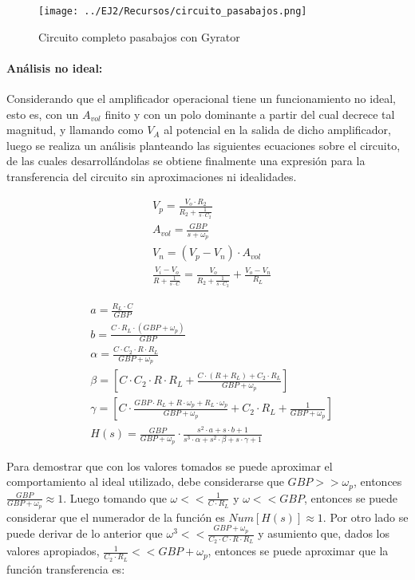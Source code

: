 \begin{figure}[H]
    \centering
    \texttt{[image: ../EJ2/Recursos/circuito\_pasabajos.png]}
    \caption{Circuito completo pasabajos con Gyrator}
    \label{fig:circuito_pasabajos}
\end{figure}

\paragraph*{An\'alisis no ideal:} Considerando que el amplificador operacional tiene un funcionamiento no ideal, esto es, con un $A_{vol}$ finito y con un polo dominante
a partir del cual decrece tal magnitud, y llamando como $V_A$ al potencial en la salida de dicho amplificador, luego se realiza un an\'alisis planteando las siguientes ecuaciones
sobre el circuito, de las cuales desarroll\'andolas se obtiene finalmente una expresi\'on para la transferencia del circuito sin aproximaciones ni idealidades.

\begin{align}
    & V_p = \frac{V_o \cdot R_2}{R_2 + \frac{1}{s \cdot C_2}} \\
    & A_{vol} = \frac{GBP}{s + \omega_p} \\
    & V_n = (V_p - V_n) \cdot A_{vol} \\
    & \frac{V_i - V_o}{R + \frac{1}{s \cdot C}} = \frac{V_o}{R_2 + \frac{1}{s \cdot C_2}} + \frac{V_o - V_n}{R_L}
\end{align}

\begin{align*}
    & a = \frac{R_L \cdot C}{GBP} \\
    & b = \frac{C \cdot R_L \cdot (GBP + \omega_p)}{GBP} \\
    & \alpha = \frac{C \cdot C_2 \cdot R \cdot R_L}{GBP + \omega_p} \\
    & \beta = \left[ C \cdot C_2 \cdot R \cdot R_L + \frac{C \cdot (R + R_L) + C_2 \cdot R_L}{GBP + \omega_p} \right] \\
    & \gamma = \left[C \cdot \frac{GBP \cdot R_L + R \cdot \omega_p + R_L \cdot \omega_p}{GBP + \omega_p} + C_2 \cdot R_L + \frac{1}{GBP + \omega_p} \right] \\
    & H(s) = \frac{GBP}{GBP + \omega_p} \cdot
    \frac{s^{2} \cdot a + s \cdot b + 1}
    {s^{3} \cdot \alpha + s^{2} \cdot \beta + s \cdot \gamma + 1} 
\end{align*}

Para demostrar que con los valores tomados se puede aproximar el comportamiento al ideal utilizado, debe considerarse que $GBP >> \omega_p$, entonces $\frac{GBP}{GBP + \omega_p} \approx 1$. Luego tomando que $\omega << \frac{1}{C \cdot R_L}$ y $\omega << GBP$, entonces se puede
considerar que el numerador de la funci\'on es $Num[H(s)] \approx 1$. Por otro lado se puede derivar de lo anterior que $\omega^{3} << \frac{GBP + \omega_p}{C_2 \cdot C \cdot R \cdot R_L}$ y asumiento que, dados los valores apropiados, $\frac{1}{C_2 \cdot R_L} << GBP + \omega_p$, entonces se puede aproximar
que la funci\'on transferencia es:

